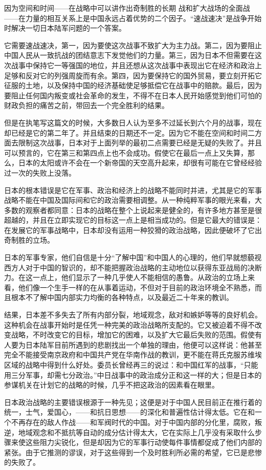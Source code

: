 \documentclass[10pt]{book}
\begin{document}
因为空间和时间——在战略中可以讲作出奇制胜的长期 战和扩大战场的全面战——在力量的相互关系上是中国永远占着优势的二个因子。“速战速决”是战争开始时解决一切日本陆军问题的一个答案。

它需要速战速决，第一，因为要使这次战事不致扩大为主力战。第二，因为要阻止中国人民从一致抗战的团结意志下发觉他们的力量。第三，因为日本不但需要在这次战事中保持它一等强国的地位，并且还想从这次战事中表现出它在经济和政治上足够和反对它的列强周旋而有余。第四，因为要保持它的国外贸易，要立刻开拓它征服的土地，以及保持中国的经济基础使足够抵偿它在战事中的赔款。最后，因为要阻止任何国内叛变或社会革命的发生，不得不在日本人民开始感觉到他们可怕的财政负担的痛苦之前，带回去一个完全胜利的结果。

但是在执笔写这篇文的时候，大多数日人认为至多不过延长到六个月的战事，现在却已经是它的第二年了。并且结束的日期还不一定。因为它不能在空间和时间二方面去限制这次战事，日本对于上面列举的最初二点需要已经是无疑的失败了。并且可以预言的，它在第三和第四点上也不会成功。假使它在最后一点上又失算，那么，日本的太阳或许不会在一个新帝国的天空高升起来，却很有可能在它曾经经验过一次的失败上没落。

日本的根本错误是它在军事、政治和经济上的战略不能同时并进，尤其是它的军事战略不能在中国及国际间和它的政治需要相调整。从一种纯粹军事的眼光来看，大多数的观察者都同意：日本的战略在整个上说起来是健全的，有许多地方甚至是很超越的，并且在立即实现它的目标这一点上是相当成功的。但是它最大的错误是：在发展它的军事战略中，日本却没有运用一种狡猾的政治战略，因此便破坏了它出奇制胜的立场。

日本的军事专家，他们自信是十分“了解中国”和中国人的心理的，他们早就想藐视西方人对于中国的智识的，却不能把握政治战略的主动地位以获得东亚战局的决断力。在这一点上，他们显示了一种几乎使人不能相信的愚鲁。从政治的立场上来看，他们像一个生手一样的在从事着运动，不但对于目前的政治环境全不熟悉，而且根本不了解中国内部实力均衡的各种特点，以及最近二十年来的教训。

结果，日本差不多失去了所有内部分裂，地域观念，敌对和嫉妒等等的良好机会。这种机会在战事开始时是任凭一种完美的政治战略所支配的。它又被迫着不得不改变战略，不时改变它的目标，增加它的困难，以及扩大它最后失败的范围。假使有人要为日本陆军目前所遇到的悲剧找出一个单独的理由，他便可以这样说：他甚至完全不能接受南京政府和中国共产党在华南作战的教训，更不能在蒋氏克服苏维埃区域的战略中得到什么好处。委员长曾经再三的说过：和中国红军的战事，“只能用三分军事，却需七分政治。”中日战事中的政治成分正和这一样的大；但是日本的参谋机关在计划它的战略的时候，几乎不把这政治的因素看在眼里。

日本政治战略的主要错误根源于一种先见；这便是对于中国人民目前正在推行着的统一，士气，爱国心，——和抗日思想——的深化和普遍性估计得太低。它在和一个不再存在的敌人作战——和军阀时代的中国。对于中国内部的分化里，腐败，叛逆，地域观念和不抵抗等自动的成分估计得太大，它在实际上几乎没有采取什么步骤来使这些阻力尖锐化，但是却因为它的军事行动使每件事情都促成了他们内部的紧张。由于它推测的谬误，对于这些得到一个及时胜利所必需的希望，它已是悲惨的失败了。
\end{document}
